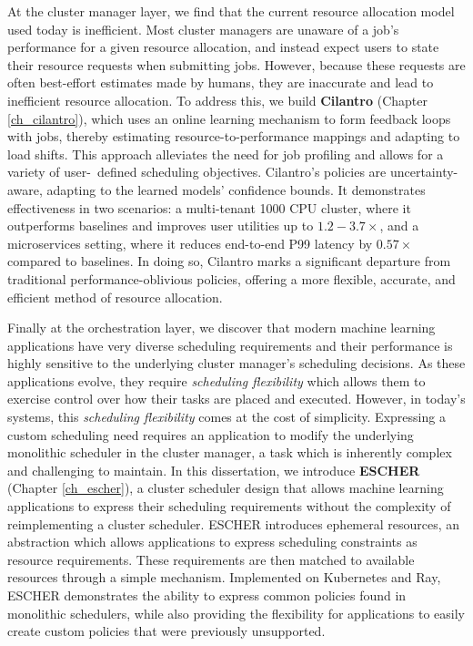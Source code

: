 At the cluster manager layer, we find that the current resource allocation model used today is inefficient. Most cluster managers are unaware of a job's performance for a given resource allocation, and instead expect users to state their resource requests when submitting jobs. However, because these requests are often best-effort estimates made by humans, they are inaccurate and lead to inefficient resource allocation. To address this, we build \textbf{Cilantro} (Chapter \ref{ch_cilantro}), which uses an online learning mechanism to form feedback loops with jobs, thereby estimating resource-to-performance mappings and adapting to load shifts. This approach alleviates the need for job profiling and allows for a variety of user- defined scheduling objectives. Cilantro's policies are uncertainty-aware, adapting to the learned models' confidence bounds. It demonstrates effectiveness in two scenarios: a multi-tenant 1000 CPU cluster, where it outperforms baselines and improves user utilities up to $1.2-3.7\times$, and a microservices setting, where it reduces end-to-end P99 latency by $0.57\times$ compared to baselines. In doing so, Cilantro marks a significant departure from traditional performance-oblivious policies, offering a more flexible, accurate, and efficient method of resource allocation.

Finally at the orchestration layer, we discover that modern machine learning applications have very diverse scheduling requirements and their performance is highly sensitive to the underlying cluster manager's scheduling decisions.  As these applications evolve, they require \textit{scheduling flexibility} which allows them to exercise control over how their tasks are placed and executed. However, in today's systems, this \textit{scheduling flexibility} comes at the cost of simplicity. Expressing a custom scheduling need requires an application to modify the underlying monolithic scheduler in the cluster manager, a task which is inherently complex and challenging to maintain. In this dissertation, we introduce \textbf{ESCHER} (Chapter \ref{ch_escher}), a cluster scheduler design that allows machine learning applications to express their scheduling requirements without the complexity of reimplementing a cluster scheduler. ESCHER introduces ephemeral resources, an abstraction which allows applications to express scheduling constraints as resource requirements. These requirements are then matched to available resources through a simple mechanism. Implemented on Kubernetes and Ray, ESCHER demonstrates the ability to express common policies found in monolithic schedulers, while also providing the flexibility for applications to easily create custom policies that were previously unsupported. %

